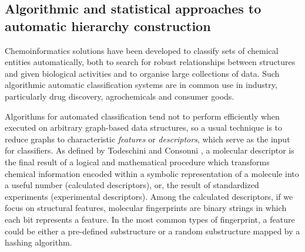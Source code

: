 \documentclass[10pt]{bmc_article}
\newenvironment{bmcformat}{\baselineskip20pt\sloppy\setboolean{publ}{false}}{\baselineskip20pt\sloppy}
\begin{document}
\begin{bmcformat}
\subsection*{Algorithmic and statistical approaches to automatic hierarchy construction}
\label{sec:resultscheminf}


Chemoinformatics solutions have been developed to classify sets of chemical entities automatically, both to search for robust relationships between structures and given biological activities and to organise large collections of data. Such algorithmic automatic classification systems are in common use in industry, particularly drug discovery, agrochemicals and consumer goods.  

Algorithms for automated classification tend not to perform efficiently when executed on arbitrary graph-based data structures, so a usual technique is to reduce graphs to characteristic \textit{features} or \textit{descriptors}, which serve as the input for classifiers. As defined by Todeschini and Consonni \cite{Todeschini2000}, a molecular descriptor is the final result of a logical and mathematical procedure which transforms chemical information encoded within a symbolic representation of a molecule into a useful number (calculated descriptors), or, the result of standardized experiments (experimental descriptors). Among the calculated descriptors, if we focus on structural features, molecular fingerprints are binary strings in which each bit represents a feature.  In the most common types of fingerprint, a feature could be either a pre-defined substructure or a random substructure mapped by a hashing algorithm.


\end{bmcformat}
\end{document}
